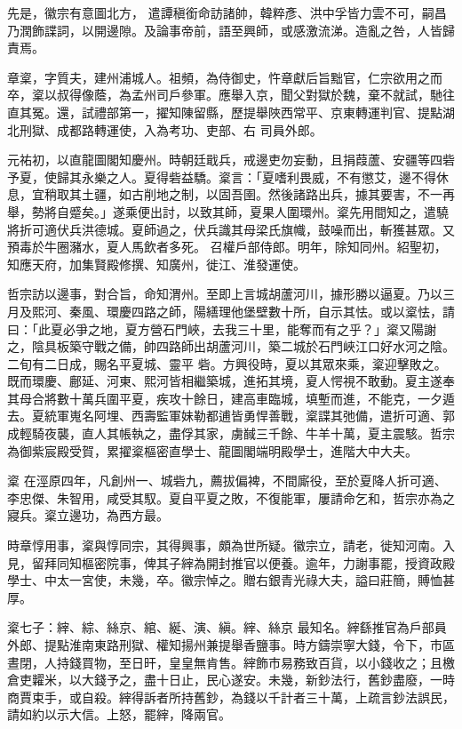 \begin{pinyinscope}
 先是，徽宗有意圖北方，
 遣譚稹銜命訪諸帥，韓粹彥、洪中孚皆力雲不可，嗣昌乃潤飾諜詞，以開邊隙。及論事帝前，語至興師，或感激流涕。造亂之咎，人皆歸責焉。



 章楶，字質夫，建州浦城人。祖頻，為侍御史，忤章獻后旨黜官，仁宗欲用之而卒，楶以叔得像蔭，為孟州司戶參軍。應舉入京，聞父對獄於魏，棄不就試，馳往直其冤。還，試禮部第一，擢知陳留縣，歷提舉陜西常平、京東轉運判官、提點湖北刑獄、成都路轉運使，入為考功、吏部、右
 司員外郎。



 元祐初，以直龍圖閣知慶州。時朝廷戢兵，戒邊吏勿妄動，且捐葭蘆、安疆等四砦予夏，使歸其永樂之人。夏得砦益驕。楶言：「夏嗜利畏威，不有懲艾，邊不得休息，宜稍取其土疆，如古削地之制，以固吾圉。然後諸路出兵，據其要害，不一再舉，勢將自蹙矣。」遂乘便出討，以致其師，夏果人圍環州。楶先用間知之，遣驍將折可適伏兵洪德城。夏師過之，伏兵識其母梁氏旗幟，鼓噪而出，斬獲甚眾。又預毒於牛圈瀦水，夏人馬飲者多死。
 召權戶部侍郎。明年，除知同州。紹聖初，知應天府，加集賢殿修撰、知廣州，徙江、淮發運使。



 哲宗訪以邊事，對合旨，命知渭州。至即上言城胡蘆河川，據形勝以逼夏。乃以三月及熙河、秦風、環慶四路之師，陽繕理他堡壁數十所，自示其怯。或以楶怯，請曰：「此夏必爭之地，夏方營石門峽，去我三十里，能奪而有之乎？」楶又陽謝之，陰具板築守戰之備，帥四路師出胡蘆河川，築二城於石門峽江口好水河之陰。二旬有二日成，賜名平夏城、靈平
 砦。方興役時，夏以其眾來乘，楶迎擊敗之。既而環慶、鄜延、河東、熙河皆相繼築城，進拓其境，夏人愕視不敢動。夏主遂奉其母合將數十萬兵圍平夏，疾攻十餘日，建高車臨城，填塹而進，不能克，一夕遁去。夏統軍嵬名阿埋、西壽監軍妹勒都逋皆勇悍善戰，楶諜其弛備，遣折可適、郭成輕騎夜襲，直人其帳執之，盡俘其家，虜馘三千餘、牛羊十萬，夏主震駭。哲宗為御紫宸殿受賀，累擢楶樞密直學士、龍圖閣端明殿學士，進階大中大夫。



 楶
 在涇原四年，凡創州一、城砦九，薦拔偏裨，不間廝役，至於夏降人折可適、李忠傑、朱智用，咸受其馭。夏自平夏之敗，不復能軍，屢請命乞和，哲宗亦為之寢兵。楶立邊功，為西方最。



 時章惇用事，楶與惇同宗，其得興事，頗為世所疑。徽宗立，請老，徙知河南。入見，留拜同知樞密院事，俾其子縡為開封推官以便養。逾年，力謝事罷，授資政殿學士、中太一宮使，未幾，卒。徽宗悼之。贈右銀青光祿大夫，謚曰莊簡，賻恤甚厚。



 楶七子：縡、綜、絲京、綰、綖、演、縝。縡、絲京
 最知名。縡繇推官為戶部員外郎、提點淮南東路刑獄、權知揚州兼提舉香鹽事。時方鑄崇寧大錢，令下，市區晝閉，人持錢買物，至日旰，皇皇無肯售。縡飾市易務致百貨，以小錢收之；且檄倉吏糶米，以大錢予之，盡十日止，民心遂安。未幾，新鈔法行，舊鈔盡廢，一時商賈束手，或自殺。縡得訴者所持舊鈔，為錢以千計者三十萬，上疏言鈔法誤民，請如約以示大信。上怒，罷縡，降兩官。




\end{pinyinscope}

